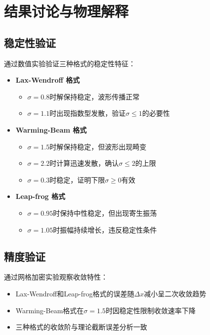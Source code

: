 \documentclass[UTF8]{ctexart}
\begin{document}
\section{结果讨论与物理解释}

\subsection{稳定性验证}
通过数值实验验证三种格式的稳定性特征：

\begin{itemize}
    \item \textbf{Lax-Wendroff 格式}
    \begin{itemize}
        \item $\sigma=0.8$时解保持稳定，波形传播正常
        \item $\sigma=1.1$时出现指数型发散，验证$\sigma\leq1$的必要性
    \end{itemize}
    
    \item \textbf{Warming-Beam 格式}
    \begin{itemize}
        \item $\sigma=1.5$时解保持稳定，但波形出现畸变
        \item $\sigma=2.2$时计算迅速发散，确认$\sigma\leq2$的上限
        \item $\sigma=0.3$时稳定，证明下限$\sigma\geq0$有效
    \end{itemize}
    
    \item \textbf{Leap-frog 格式}
    \begin{itemize}
        \item $\sigma=0.95$时保持中性稳定，但出现寄生振荡
        \item $\sigma=1.05$时振幅持续增长，违反稳定性条件
    \end{itemize}
\end{itemize}

\subsection{精度验证}
通过网格加密实验观察收敛特性：

\begin{itemize}
    \item Lax-Wendroff和Leap-frog格式的误差随$\Delta x$减小呈二次收敛趋势
    \item Warming-Beam格式在$\sigma=1.5$时因稳定性限制收敛速率下降
    \item 三种格式的收敛阶与理论截断误差分析一致
\end{itemize}
\end{document}

